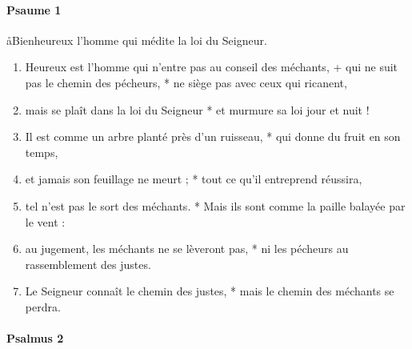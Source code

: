 \documentclass[twoside]{article}
\begin{document}
\begin{paracol}[1]{2}
\switchcolumn

\paragraph{Psaume 1}
\aa Bienheureux l'homme qui médite la loi du Seigneur.


\begin{enumerate}[wide, itemsep=0mm, labelwidth=!, labelindent=0pt, label=\color{gregoriocolor}\theenumi]
\item Heureux est l'homme qui n'entre pas au conseil des méchants, + qui ne suit pas le chemin des pécheurs, * ne siège pas avec ceux qui ricanent,
\item mais se plaît dans la loi du Seigneur * et murmure sa loi jour et nuit !
\item Il est comme un arbre planté près d'un ruisseau, * qui donne du fruit en son temps,
\item et jamais son feuillage ne meurt ; * tout ce qu'il entreprend réussira,
\item tel n'est pas le sort des méchants. * Mais ils sont comme la paille balayée par le vent :
\item au jugement, les méchants ne se lèveront pas, * ni les pécheurs au rassemblement des justes.
\item Le Seigneur connaît le chemin des justes, * mais le chemin des méchants se perdra.
\end{enumerate}

\switchcolumn*
\paragraph{Psalmus 2}



\end{paracol}
\end{document}
